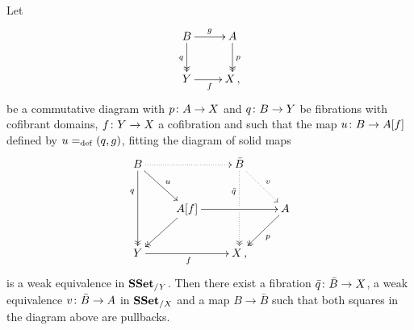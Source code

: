 \documentclass[reqno,10pt,a4paper,oneside,draft]{amsart}
\begin{document}
\begin{proposition}
\label{Prop:Homotopy_ext_prop}
Let 
\[
\xymatrix{
B \ar[r]^g \ar@{->>}[d]_q & A \ar@{->>}[d]^p \\
Y \ar[r]_f & X \, ,}
\]
be a commutative diagram with $p \colon A \to X$ and $q \colon B \to Y$ be fibrations with cofibrant domains, $f \colon Y \to X$ 
a cofibration and such that the map $u \colon B \to A[f]$ defined by $u =_{\operatorname{def}} (q, g)$, fitting the diagram 
of solid maps
\[ 
\xymatrix{
 B
  \ar@{.>}[rr]
  \ar[dr]^{u}
  \ar@{->>}[dd]_(.3){q}
&&
  \bar{B}
  \ar@{.>}[dr]^{v}
  \ar@{.>>}[dd]_(.3){\bar{q}}|{\hole}
&\\&
  A[f] 
  \ar[rr]
  \ar@{->>}[dl]
&&
  A
  \ar@{->>}[dl]^{p}
\\
  Y
  \ar[rr]_{f}
&&
  X \, ,
&
}
\]
is a weak equivalence in $\mathbf{SSet}_{/ Y}$. Then there exist a fibration $\bar{q} \colon \bar{B} \to X$, a weak equivalence $v \colon \bar{B} \to A$ in $\mathbf{SSet}_{/X}$ and a map $B \to \bar{B}$ such that both squares in the diagram above are pullbacks. 
\end{proposition}
\end{document}
